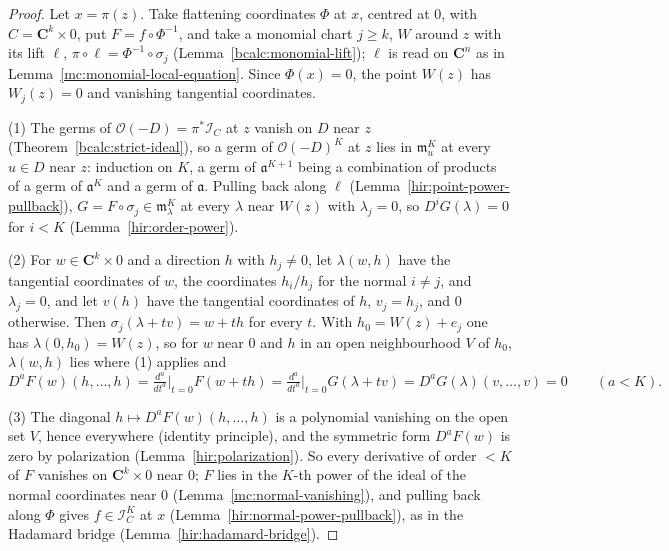 \begin{proof}
\leanok
Let \(x=\pi(z)\). Take flattening coordinates \(\Phi\) at \(x\), centred at \(0\), with \(C=\mathbf C^k\times0\), put \(F=f\circ\Phi^{-1}\), and take a monomial
chart \(j\ge k\), \(W\) around \(z\) with its lift \(\ell\), \(\pi\circ\ell=\Phi^{-1}\circ\sigma_j\) (Lemma~\ref{bcalc:monomial-lift}); \(\ell\) is read on
\(\mathbf C^n\) as in Lemma~\ref{mc:monomial-local-equation}. Since \(\Phi(x)=0\), the point \(W(z)\) has \(W_j(z)=0\) and vanishing tangential coordinates.

(1) The germs of \(\mathcal O(-D)=\pi^*\mathcal I_C\) at \(z\) vanish on \(D\) near \(z\) (Theorem~\ref{bcalc:strict-ideal}), so a germ of \(\mathcal O(-D)^K\) at \(z\)
lies in \(\mathfrak m_u^K\) at every \(u\in D\) near \(z\): induction on \(K\), a germ of \(\mathfrak a^{K+1}\) being a combination of products of a germ of \(\mathfrak a^K\)
and a germ of \(\mathfrak a\). Pulling back along \(\ell\) (Lemma~\ref{hir:point-power-pullback}), \(G=F\circ\sigma_j\in\mathfrak m_\lambda^K\) at every \(\lambda\) near
\(W(z)\) with \(\lambda_j=0\), so \(D^iG(\lambda)=0\) for \(i<K\) (Lemma~\ref{hir:order-power}).

(2) For \(w\in\mathbf C^k\times0\) and a direction \(h\) with \(h_j\neq0\), let \(\lambda(w,h)\) have the tangential coordinates of \(w\), the coordinates
\(h_i/h_j\) for the normal \(i\neq j\), and \(\lambda_j=0\), and let \(v(h)\) have the tangential coordinates of \(h\), \(v_j=h_j\), and \(0\) otherwise. Then
\(\sigma_j(\lambda+tv)=w+th\) for every \(t\). With \(h_0=W(z)+e_j\) one has \(\lambda(0,h_0)=W(z)\), so for \(w\) near \(0\) and \(h\) in an open neighbourhood
\(V\) of \(h_0\), \(\lambda(w,h)\) lies where (1) applies and
\[
 D^aF(w)(h,\dots,h)=\tfrac{d^a}{dt^a}\Big|_{t=0}F(w+th)=\tfrac{d^a}{dt^a}\Big|_{t=0}G(\lambda+tv)=D^aG(\lambda)(v,\dots,v)=0\qquad(a<K).
\]

(3) The diagonal \(h\mapsto D^aF(w)(h,\dots,h)\) is a polynomial vanishing on the open set \(V\), hence everywhere (identity principle), and the
symmetric form \(D^aF(w)\) is zero by polarization (Lemma~\ref{hir:polarization}). So every derivative of order \(<K\) of \(F\) vanishes on
\(\mathbf C^k\times0\) near \(0\); \(F\) lies in the \(K\)-th power of the ideal of the normal coordinates near \(0\) (Lemma~\ref{mc:normal-vanishing}), and
pulling back along \(\Phi\) gives \(f\in\mathcal I_C^K\) at \(x\) (Lemma~\ref{hir:normal-power-pullback}), as in the Hadamard bridge
(Lemma~\ref{hir:hadamard-bridge}).
\end{proof}


